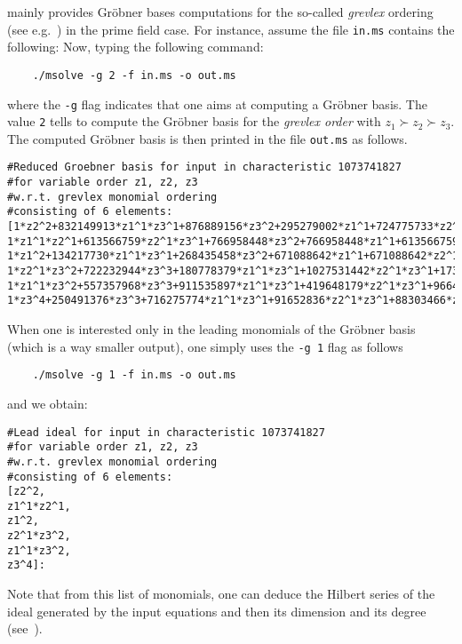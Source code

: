 \documentclass[a4paper,english,11pt]{scrartcl}
\theoremstyle{definition}
\theoremstyle{remark}
\begin{document}
\msolve mainly provides Gr\"obner bases computations for the so-called
\emph{grevlex} ordering (see e.g.~\cite{CLO}) in the prime field
case. For instance,
assume the file \verb+in.ms+ contains the following:
Now, typing the following command:
\begin{tcolorbox}
  \begin{verbatim}
    ./msolve -g 2 -f in.ms -o out.ms 
  \end{verbatim}
\end{tcolorbox}
where the \verb+-g+ flag indicates that one aims at computing a Gr\"obner
basis. The value \verb+2+ tells \msolve to compute the Gr\"obner basis for the
\emph{grevlex order} with $z_1\succ z_2 \succ z_3 $. The computed Gr\"obner basis
is then printed in the file \verb+out.ms+ as follows.
\begin{tcolorbox}
  \begin{lstlisting}
#Reduced Groebner basis for input in characteristic 1073741827
#for variable order z1, z2, z3
#w.r.t. grevlex monomial ordering
#consisting of 6 elements:
[1*z2^2+832149913*z1^1*z3^1+876889156*z3^2+295279002*z1^1+724775733*z2^1+143165573*z3^1,
1*z1^1*z2^1+613566759*z2^1*z3^1+766958448*z3^2+766958448*z1^1+613566759*z3^1+153391691,
1*z1^2+134217730*z1^1*z3^1+268435458*z3^2+671088642*z1^1+671088642*z2^1,
1*z2^1*z3^2+722232944*z3^3+180778379*z1^1*z3^1+1027531442*z2^1*z3^1+173735741*z3^2+936498976*z1^1+702034498*z2^1+921316952*z3^1+59915395,
1*z1^1*z3^2+557357968*z3^3+911535897*z1^1*z3^1+419648179*z2^1*z3^1+96648475*z3^2+698659259*z1^1+282295066*z2^1+885328953*z3^1+769127629,
1*z3^4+250491376*z3^3+716275774*z1^1*z3^1+91652836*z2^1*z3^1+88303466*z3^2+855797860*z1^1+18642214*z2^1+728901227*z3^1+969918485]:
  \end{lstlisting}
\end{tcolorbox}
When one is interested only in the leading monomials of the Gr\"obner basis
(which is a way smaller output), one simply uses the \verb+-g 1+ flag as follows
\begin{tcolorbox}
  \begin{verbatim}
    ./msolve -g 1 -f in.ms -o out.ms 
  \end{verbatim}
\end{tcolorbox}
and we obtain:
\begin{tcolorbox}
  \begin{lstlisting}
#Lead ideal for input in characteristic 1073741827
#for variable order z1, z2, z3
#w.r.t. grevlex monomial ordering
#consisting of 6 elements:
[z2^2,
z1^1*z2^1,
z1^2,
z2^1*z3^2,
z1^1*z3^2,
z3^4]:
  \end{lstlisting}
\end{tcolorbox}
Note that from this list of monomials, one can deduce the Hilbert series of the
ideal generated by the input equations and then its dimension and its degree
(see~\cite{CLO}).
\end{document}
